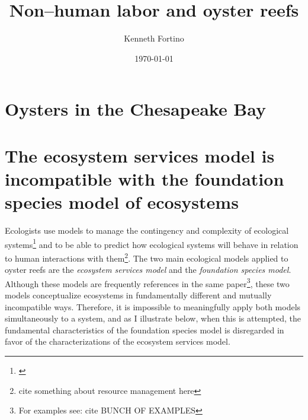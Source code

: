 \documentclass{article}
\begin{document}
\title{Non--human labor and oyster reefs}
\author{Kenneth Fortino}
\date{\today}

\maketitle

\section{Oysters in the Chesapeake Bay}

\section{The ecosystem services model is incompatible with the foundation species model of ecosystems}

Ecologists use models to manage the contingency and complexity of ecological systems\footnote{\cite{lawton_laws_1999}} and to be able to predict how ecological systems will behave in relation to human interactions with them\footnote{cite something about resource management here}. The two main ecological models applied to oyster reefs are the \emph{ecosystem services model} and the \emph{foundation species model}. Although these models are frequently references in the same paper\footnote{For examples see: cite BUNCH OF EXAMPLES}, these two models conceptualize ecosystems in fundamentally different and mutually incompatible ways. Therefore, it is impossible to meaningfully apply both models simultaneously to a system, and as I illustrate below, when this is attempted, the fundamental characteristics of the foundation species model is disregarded in favor of the characterizations of the ecosystem services model.
\end{document}
